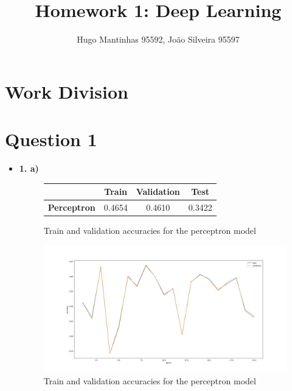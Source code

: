 \documentclass[12pt]{article}
\begin{document}
\title{Homework 1: Deep Learning}
\author{Hugo Mantinhas 95592, João Silveira 95597}

\maketitle

\section*{Work Division}

\section*{Question 1}
\begin{itemize}
    \item \textbf{1. a)}
          \begin{figure}[H]
              \centering
              \begin{tabular}{|c|c|c|c|}
                  \toprule
                                      & \textbf{Train} & \textbf{Validation} & \textbf{Test} \\
                  \midrule
                  \textbf{Perceptron} & 0.4654         & 0.4610              & 0.3422        \\
                  \bottomrule
              \end{tabular}
              \label{tab:1.1a}
              \caption{Train and validation accuracies for the perceptron model}
          \end{figure}
          \begin{figure}[H]
              \centering
              \includegraphics[width=\linewidth]{../outputs/hw1-q1-1a.png}
              \caption{Train and validation accuracies for the perceptron model}
              \label{fig:1.1a}
          \end{figure}


\end{itemize}
\end{document}

